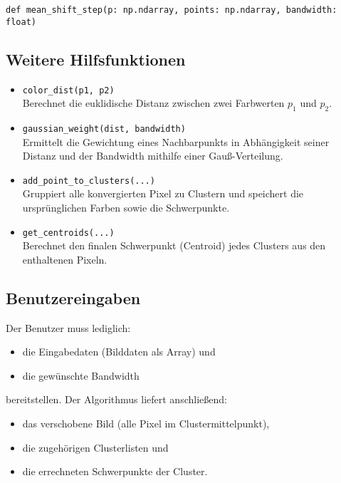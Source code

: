 \begin{verbatim}
def mean_shift_step(p: np.ndarray, points: np.ndarray, bandwidth: float)
\end{verbatim}


\subsection*{Weitere Hilfsfunktionen}

\begin{itemize}
    \item \texttt{color\_dist(p1, p2)} \\
    Berechnet die euklidische Distanz zwischen zwei Farbwerten $p_1$ und $p_2$.

    \item \texttt{gaussian\_weight(dist, bandwidth)} \\
    Ermittelt die Gewichtung eines Nachbarpunkts in Abhängigkeit seiner Distanz und der Bandwidth mithilfe einer Gauß-Verteilung.

    \item \texttt{add\_point\_to\_clusters(...)} \\
    Gruppiert alle konvergierten Pixel zu Clustern und speichert die ursprünglichen Farben sowie die Schwerpunkte.

    \item \texttt{get\_centroids(...)} \\
    Berechnet den finalen Schwerpunkt (Centroid) jedes Clusters aus den enthaltenen Pixeln.
\end{itemize}

\subsection*{Benutzereingaben}

Der Benutzer muss lediglich:

\begin{itemize}
    \item die Eingabedaten (Bilddaten als Array) und
    \item die gewünschte Bandwidth
\end{itemize}

bereitstellen. Der Algorithmus liefert anschließend:
\begin{itemize}
    \item das verschobene Bild (alle Pixel im Clustermittelpunkt),
    \item die zugehörigen Clusterlisten und
    \item die errechneten Schwerpunkte der Cluster.
\end{itemize}

\newpage

